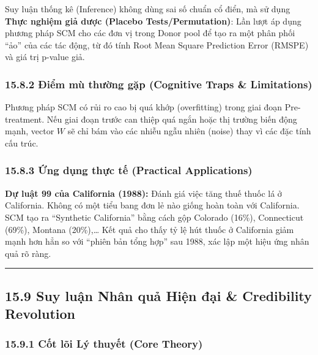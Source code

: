 \documentclass[
]{article}
\begin{document}
Suy luận thống kê (Inference) không dùng sai số chuẩn cổ điển, mà sử
dụng \textbf{Thực nghiệm giả dược (Placebo Tests/Permutation)}: Lần lượt
áp dụng phương pháp SCM cho các đơn vị trong Donor pool để tạo ra một
phân phối ``ảo'' của các tác động, từ đó tính Root Mean Square
Prediction Error (RMSPE) và giá trị p-value giả.

\subsubsection{15.8.2 Điểm mù thường gặp (Cognitive Traps \&
Limitations)}\label{ux111iux1ec3m-muxf9-thux1b0ux1eddng-gux1eb7p-cognitive-traps-limitations-104}

Phương pháp SCM có rủi ro cao bị quá khớp (overfitting) trong giai đoạn
Pre-treatment. Nếu giai đoạn trước can thiệp quá ngắn hoặc thị trường
biến động mạnh, vector \(W\) sẽ chỉ bám vào các nhiễu ngẫu nhiên (noise)
thay vì các đặc tính cấu trúc.

\subsubsection{15.8.3 Ứng dụng thực tế (Practical
Applications)}\label{ux1ee9ng-dux1ee5ng-thux1ef1c-tux1ebf-practical-applications-60}

\textbf{Dự luật 99 của California (1988):} Đánh giá việc tăng thuế thuốc
lá ở California. Không có một tiểu bang đơn lẻ nào giống hoàn toàn với
California. SCM tạo ra ``Synthetic California'' bằng cách gộp Colorado
(16\%), Connecticut (69\%), Montana (20\%),\ldots{} Kết quả cho thấy tỷ
lệ hút thuốc ở California giảm mạnh hơn hẳn so với ``phiên bản tổng
hợp'' sau 1988, xác lập một hiệu ứng nhân quả rõ ràng.

\begin{center}\rule{0.5\linewidth}{0.5pt}\end{center}

\subsection{15.9 Suy luận Nhân quả Hiện đại \& Credibility
Revolution}\label{suy-luux1eadn-nhuxe2n-quux1ea3-hiux1ec7n-ux111ux1ea1i-credibility-revolution}

\subsubsection{15.9.1 Cốt lõi Lý thuyết (Core
Theory)}\label{cux1ed1t-luxf5i-luxfd-thuyux1ebft-core-theory-54}
\end{document}
